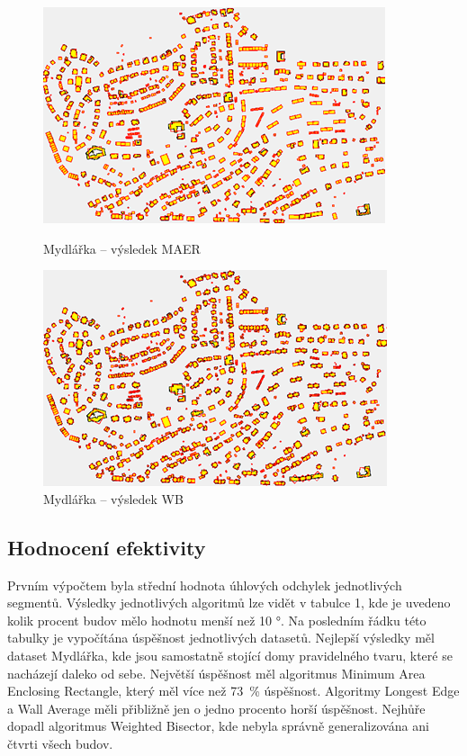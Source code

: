 \documentclass{article}
\begin{document}
\begin{spacing}{1.5}
\begin{figure}[htbp]
  \centering
  \begin{minipage}[b]{0.47\textwidth}
    \includegraphics[width=\textwidth]{images/Mydl_maer.png}
    \caption{Mydlářka – výsledek MAER}
  \end{minipage}
  \hfill
  \begin{minipage}[b]{0.47\textwidth}
    \includegraphics[width=\textwidth]{images/Mydl_wb.png}
    \caption{Mydlářka – výsledek WB}
  \end{minipage}
\end{figure}


\newpage
\subsection{Hodnocení efektivity}
Prvním výpočtem byla střední hodnota úhlových odchylek jednotlivých segmentů. Výsledky jednotlivých algoritmů lze vidět v tabulce 1, kde je uvedeno kolik procent budov mělo hodnotu menší než 10 °. Na posledním řádku této tabulky je vypočítána úspěšnost jednotlivých datasetů.  Nejlepší výsledky měl dataset Mydlářka, kde jsou samostatně stojící domy pravidelného tvaru, které se nacházejí daleko od sebe. Největší úspěšnost měl algoritmus Minimum Area Enclosing Rectangle, který měl více než 73~\% úspěšnost. Algoritmy Longest Edge a Wall Average měli přibližně jen o jedno procento horší úspěšnost. Nejhůře dopadl algoritmus Weighted Bisector, kde nebyla správně generalizována ani čtvrti všech budov.  


\end{spacing}
\end{document}
